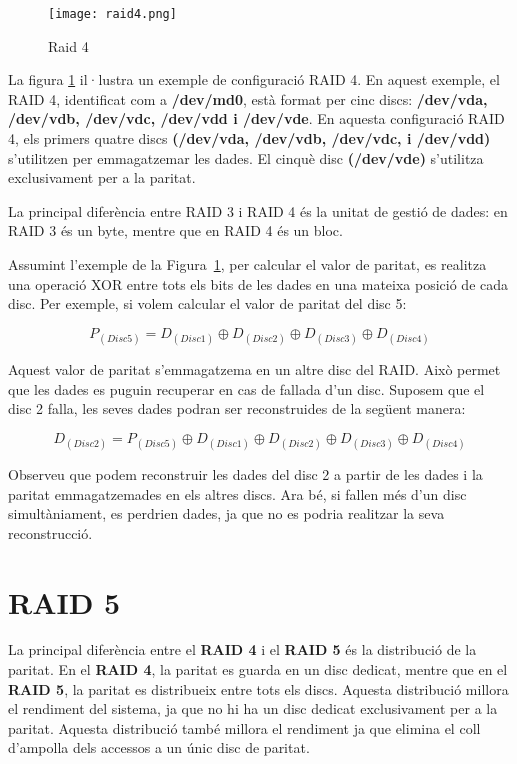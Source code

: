 \begin{figure}[!htb]
\centering
\texttt{[image: raid4.png]}
\caption{Raid 4}
\label{fig:raid4}
\end{figure}

La figura \ref{fig:raid4} il·lustra un exemple de configuració RAID 4. En aquest exemple, el RAID 4, identificat com a \textbf{/dev/md0}, està format per cinc discs: \textbf{/dev/vda, /dev/vdb, /dev/vdc, /dev/vdd i /dev/vde}. En aquesta configuració RAID 4, els primers quatre discs \textbf{(/dev/vda, /dev/vdb, /dev/vdc, i /dev/vdd)} s'utilitzen per emmagatzemar les dades. El cinquè disc \textbf{(/dev/vde)} s'utilitza exclusivament per a la paritat.

\begin{info}
        La principal diferència entre RAID 3 i RAID 4 és la unitat de gestió de dades: en RAID 3 és un byte, mentre que en RAID 4 és un bloc.
\end{info}

Assumint l'exemple de la Figura~\ref{fig:raid4}, per calcular el valor de paritat, es realitza una operació XOR entre tots els bits de les dades en una mateixa posició de cada disc. Per exemple, si volem calcular el valor de paritat del disc 5:

\[P_{(Disc5)} = D_{(Disc1)} \oplus D_{(Disc2)} \oplus D_{(Disc3)}  \oplus D_{(Disc4)}\]

Aquest valor de paritat s'emmagatzema en un altre disc del RAID. Això permet que les dades es puguin recuperar en cas de fallada d'un disc. Suposem que el disc 2 falla, les seves dades podran ser reconstruides de
la següent manera:

\[D_{(Disc2)} = P_{(Disc5)} \oplus D_{(Disc1)} \oplus D_{(Disc2)} \oplus D_{(Disc3)}  \oplus D_{(Disc4)}\]

Observeu que podem reconstruir les dades del disc 2 a partir de les dades i la paritat emmagatzemades en els altres discs. Ara bé, si fallen més d'un disc simultàniament, es perdrien dades, ja que no es podria realitzar la seva reconstrucció.

\section{RAID 5}\label{raid-5}

La principal diferència entre el \textbf{RAID 4} i el \textbf{RAID 5} és la distribució de la paritat. En el \textbf{RAID 4}, la paritat es guarda en un disc dedicat, mentre que en el \textbf{RAID 5}, la paritat es distribueix entre tots els discs. Aquesta distribució millora el rendiment del sistema, ja que no hi ha un disc dedicat exclusivament per a la paritat. Aquesta distribució també millora el rendiment ja que elimina el coll  d'ampolla dels accessos a un únic disc de paritat. 


